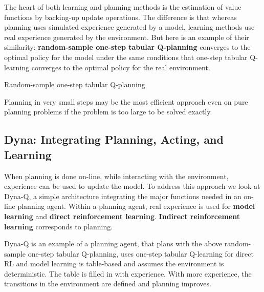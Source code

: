 \documentclass[11pt]{article}
\begin{document}
The heart of both learning and planning methods is the estimation of value
functions by backing-up update operations. The difference is that whereas
planning uses simulated experience generated by a model, learning methods use
real experience generated by the environment. But here is an example of their
similarity: \textbf{random-sample one-step tabular Q-planning} converges to the optimal
policy for the model under the same conditions that one-step tabular Q-learning
converges to the optimal policy for the real environment.
\newline
\newline
\begin{algorithm}[H]
\caption{Random-sample one-step tabular Q-planning}
\end{algorithm}

Planning in very small steps may be the most efficient approach even on pure
planning problems if the problem is too large to be solved exactly.

\subsection{Dyna: Integrating Planning, Acting, and Learning}
\label{sec:org71e8dff}

When planning is done on-line, while interacting with the environment, experience
can be used to update the model. To address this approach we look at Dyna-Q, a
simple architecture integrating the major functions needed in an on-line
planning agent. Within a planning agent, real experience is used for \textbf{model
learning} and \textbf{direct reinforcement learning}. \textbf{Indirect reinforcement learning}
corresponds to planning.

Dyna-Q is an example of a planning agent, that plans with the above
random-sample one-step tabular Q-planning, uses one-step tabular Q-learning for
direct RL and model learning is table-based and assumes the environment is
deterministic. The table is filled in with experience. With more experience, the
transitions in the environment are defined and planning improves.
\end{document}
